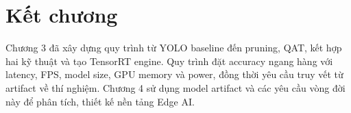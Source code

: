 \section{Kết chương}

Chương 3 đã xây dựng quy trình từ YOLO baseline đến pruning, QAT, kết hợp hai
kỹ thuật và tạo TensorRT engine. Quy trình đặt accuracy ngang hàng với latency,
FPS, model size, GPU memory và power, đồng thời yêu cầu truy vết từ artifact về
thí nghiệm. Chương 4 sử dụng model artifact và các yêu cầu vòng đời này để phân
tích, thiết kế nền tảng Edge AI.